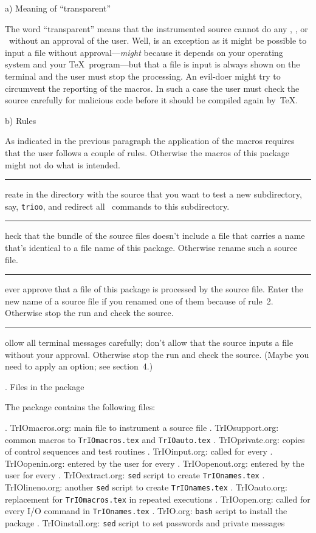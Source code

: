 \beginsection \rm a) Meaning of ``transparent'' 

The word ``transparent'' means that the instrumented source cannot do
any \cs, \cs\openin, or \cs\openout\ without an approval of the
user. Well, {\tt\string} is an exception as it might be possible
to input a file without approval---{\sl might} because it depends on
your operating system and your \TeX\ program---but that a file is
input is always shown on the terminal and the user must stop the
processing. An evil-doer might try to circumvent the reporting of the
macros. In such a case the user must check the source carefully for
malicious code before it should be compiled again by~\TeX.

\beginsection \rm b) Rules

As indicated in the previous paragraph the application of the macros
requires that the user follows a couple of rules. Otherwise the macros
of this package might not do what is intended.

 \rule1 Create in the directory with the source that you want to test
a new subdirectory, say, {\tt trioo}, and redirect all \cs\openout\
commands to this subdirectory.

 \rule2 Check that the bundle of the source files doesn't include a
file that carries a name that's identical to a file name of this
package. Otherwise rename such a source file.

 \rule3 Never approve that a file of this package is processed by the
source file. Enter the new name of a source file if you renamed one of
them because of rule~2. Otherwise stop the run and check the source.

 \rule4 Follow all terminal messages carefully; don't allow that the
source inputs a file without your approval. Otherwise stop the run and
check the source. (Maybe you need to apply an option; see section~4.)



. Files in the package

The package contains the following files:

\medskip
{}. TrIOmacros.org: main file to instrument a source file
\filename  2. TrIOsupport.org: common macros to {\tt TrIOmacros.tex} and {\tt TrIOauto.tex}
\filename  3. TrIOprivate.org: copies of control sequences and test routines
\filename  4. TrIOinput.org: called for every \cs
{}. TrIOopenin.org: entered by the user for every \cs\openin
\filename  6. TrIOopenout.org: entered by the user for every \cs\openout
\smallskip
{}. TrIOextract.org: {\tt sed} script to create {\tt TrIOnames.tex}
\filename  8. TrIOlineno.org: another {\tt sed} script to create {\tt TrIOnames.tex}
\filename  9. TrIOauto.org: replacement for {\tt TrIOmacros.tex} in repeated executions
\filename 10. TrIOopen.org: called for every I/O command in {\tt TrIOnames.tex}
\smallskip
{}. TrIO.org: {\tt bash} script to install the package
\filename 12. TrIOinstall.org: {\tt sed} script to set passwords and private messages
\filbreak\medskip

